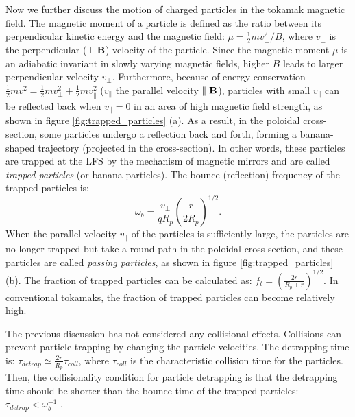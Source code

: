 Now we further discuss the motion of charged particles in the tokamak magnetic field. The magnetic moment of a particle is defined as the ratio between its perpendicular kinetic energy and the magnetic field: $\mu = \frac{1}{2}mv_{\perp}^2/B$, where $v_{\perp}$ is the perpendicular ($\perp \boldsymbol{\mathrm{B}}$) velocity of the particle. Since the magnetic moment $\mu$ is an adiabatic invariant in slowly varying magnetic fields, higher $B$ leads to larger perpendicular velocity $v_{\perp}$. Furthermore, because of energy conservation $\frac{1}{2}mv^2 = \frac{1}{2}mv_{\perp}^2 + \frac{1}{2}mv_{\parallel}^2$ ($v_{\parallel}$ the parallel velocity $\parallel \boldsymbol{\mathrm{B}}$), particles with small $v_{\parallel}$ can be reflected back when $v_{\parallel} = 0$ in an area of high magnetic field strength, as shown in figure \ref{fig:trapped_particles} (a). As a result, in the poloidal cross-section, some particles undergo a reflection back and forth, forming a banana-shaped trajectory (projected in the cross-section). In other words, these particles are trapped at the LFS by the mechanism of magnetic mirrors and are called \emph{trapped particles} (or banana particles). The bounce (reflection) frequency of the trapped particles is:%
\begin{equation}
\omega_b = \frac{v_{\perp}}{qR_p}\left(\frac{r}{2R_p}\right)^{1/2}.
\end{equation}
\noindent When the parallel velocity $v_{\parallel}$ of the particles is sufficiently large, the particles are no longer trapped but take a round path in the poloidal cross-section, and these particles are called \emph{passing particles}, as shown in figure \ref{fig:trapped_particles} (b). The fraction of trapped particles can be calculated as: $f_t = (\frac{2r}{R_p + r})^{1/2}$. In conventional tokamaks, the fraction of trapped particles can become relatively high.


The previous discussion has not considered any collisional effects. Collisions can prevent particle trapping by changing the particle velocities. The detrapping time is: $\tau_{detrap} \simeq \frac{2r}{R_p}\tau_{coll}$, where $\tau_{coll}$ is the characteristic collision time for the particles. Then, the collisionality condition for particle detrapping is that the detrapping time should be shorter than the bounce time of the trapped particles: $\tau_{detrap} < \omega_b^{-1}$ \cite{Wesson_1997_Tokamaks}.


